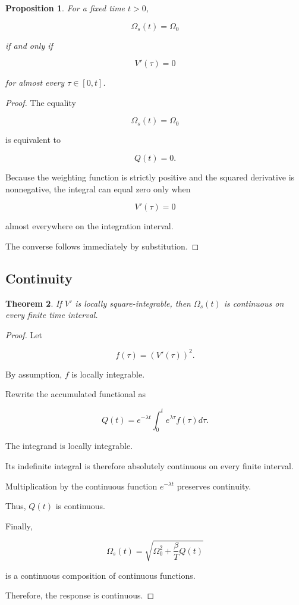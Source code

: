 \documentclass[12pt]{article}
\newtheorem{theorem}{Theorem}[section]
\newtheorem{proposition}[theorem]{Proposition}
\theoremstyle{definition}
\theoremstyle{remark}
\begin{document}
\begin{proposition}

For a fixed time \(t>0\),

\[
\Omega_s(t)=\Omega_0
\]

if and only if

\[
V'(\tau)=0
\]

for almost every \(\tau\in[0,t]\).

\end{proposition}

\begin{proof}

The equality

\[
\Omega_s(t)=\Omega_0
\]

is equivalent to

\[
Q(t)=0.
\]

Because the weighting function is strictly
positive and the squared derivative is
nonnegative, the integral can equal zero
only when

\[
V'(\tau)=0
\]

almost everywhere on the integration interval.

The converse follows immediately by substitution.

\end{proof}

\subsection{Continuity}

\begin{theorem}

If \(V'\) is locally square-integrable, then
\(\Omega_s(t)\) is continuous on every finite
time interval.

\end{theorem}

\begin{proof}

Let

\[
f(\tau)=\left(V'(\tau)\right)^2.
\]

By assumption, \(f\) is locally integrable.

Rewrite the accumulated functional as

\[
Q(t)=
e^{-\lambda t}
\int_0^t e^{\lambda\tau}f(\tau)d\tau.
\]

The integrand is locally integrable.

Its indefinite integral is therefore
absolutely continuous on every finite interval.

Multiplication by the continuous function
\(e^{-\lambda t}\) preserves continuity.

Thus, \(Q(t)\) is continuous.

Finally,

\[
\Omega_s(t)=
\sqrt{\Omega_0^2+\frac{\beta}{T}Q(t)}
\]

is a continuous composition of continuous
functions.

Therefore, the response is continuous.

\end{proof}
\end{document}
